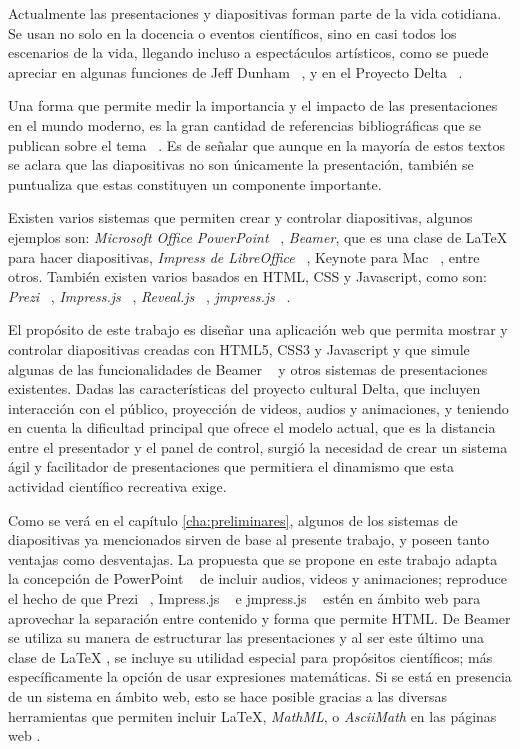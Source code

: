 \begin{introduction}

	Actualmente las presentaciones y diapositivas forman parte de la vida cotidiana. Se usan no solo en la docencia o eventos científicos, sino en casi todos los escenarios de la vida, llegando incluso a espectáculos artísticos, como se puede apreciar en algunas funciones de Jeff Dunham ~\cite{dunham}, y en el Proyecto Delta ~\cite{delta}.


	Una forma que permite medir la importancia y el impacto de las presentaciones en el mundo moderno, es la gran cantidad de referencias bibliográficas que se publican sobre el tema ~\cite{alley, duarte, tufte}. Es de señalar que aunque en la mayoría de estos textos se aclara que las diapositivas no son únicamente la presentación, también se puntualiza que estas constituyen un componente importante.


	Existen varios sistemas que permiten crear y controlar diapositivas, algunos ejemplos son: \textit{Microsoft Office PowerPoint} ~\cite{powerpoint}, \textit{Beamer}, que es una clase de \LaTeX{} para hacer diapositivas, \textit{Impress de LibreOffice} ~\cite{libreoffice}, Keynote para Mac ~\cite{keynote}, entre otros. También existen varios basados en HTML, CSS y Javascript, como son: \textit{Prezi} ~\cite{prezi}, \textit{Impress.js} ~\cite{impress}, \textit{Reveal.js} ~\cite{reveal}, \textit{jmpress.js} ~\cite{jmpress}.

	El propósito de este trabajo es diseñar una aplicación web que permita mostrar y controlar diapositivas creadas con HTML5, CSS3 y Javascript y que simule algunas de las funcionalidades de Beamer ~\cite{beamer} y otros sistemas de presentaciones existentes. Dadas las características del proyecto cultural Delta, que incluyen interacción con el público, proyección de videos, audios y animaciones, y teniendo en cuenta la dificultad principal que ofrece el modelo actual, que es la distancia entre el presentador y el panel de control, surgió la necesidad de crear un sistema ágil y facilitador de presentaciones que permitiera el dinamismo que esta actividad científico recreativa exige.

	Como se verá en el capítulo \ref{cha:preliminares}, algunos de los sistemas de diapositivas ya mencionados sirven de base al presente trabajo, y poseen tanto ventajas como desventajas. La propuesta que se propone en este trabajo adapta la concepción de PowerPoint ~\cite{powerpoint} de incluir audios, videos y animaciones; reproduce el hecho de que Prezi ~\cite{prezi}, Impress.js ~\cite{impress} e jmpress.js ~\cite{jmpress} estén en ámbito web para aprovechar la separación entre contenido y forma que permite HTML. De Beamer se utiliza su manera de estructurar las presentaciones y al ser este último una clase de \LaTeX{} \cite{latex}, se incluye su utilidad especial para propósitos científicos; más específicamente la opción de usar expresiones matemáticas. Si se está en presencia de un sistema en ámbito web, esto se hace posible gracias a las diversas herramientas que permiten incluir \LaTeX, \textit{MathML}, o \textit{AsciiMath} en las páginas web \cite{mathjax, katex, phpmath}. 



\end{introduction}
